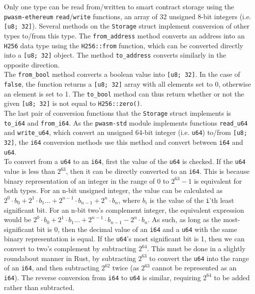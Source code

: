 Only one type can be read from/written to smart contract storage using the \texttt{pwasm-ethereum} \texttt{read}/\texttt{write} functions, an array of 32 unsigned 8-bit integers (i.e. \texttt{[u8; 32]}). Several methods on the \texttt{Storage} struct implement conversion of other types to/from this type. The \texttt{from\_address} method converts an address into an \texttt{H256} data type using the \texttt{H256::from} function, which can be converted directly into a \texttt{[u8; 32]} object. The method \texttt{to\_address} converts similarly in the opposite direction. \\

The \texttt{from\_bool} method converts a boolean value into \texttt{[u8; 32]}. In the case of \texttt{false}, the function returns a \texttt{[u8; 32]} array with all elements set to 0, otherwise an element is set to 1. The \texttt{to\_bool} method can thus return whether or not the given \texttt{[u8; 32]} is not equal to \texttt{H256::zero()}. \\

The last pair of conversion functions that the \texttt{Storage} struct implements is \texttt{to\_i64} and \texttt{from\_i64}. As the \texttt{pwasm-std} module implements functions \texttt{read\_u64} and \texttt{write\_u64}, which convert an unsigned 64-bit integer (i.e. \texttt{u64}) to/from \texttt{[u8; 32]}, the \texttt{i64} conversion methods use this method and convert between \texttt{i64} and \texttt{u64}. \\

To convert from a \texttt{u64} to an \texttt{i64}, first the value of the \texttt{u64} is checked. If the \texttt{u64} value is less than $2^{63}$, then it can be directly converted to an \texttt{i64}. This is because binary representation of an integer in the range of $0$ to $2^{63} - 1$ is equivalent for both types. For an n-bit unsigned integer, the value can be calculated as $2^0 \cdot b_0 + 2^1 \cdot b_1... + 2^{n-1} \cdot b_{n-1} + 2^n \cdot b_n$, where $b_i$ is the value of the \texttt{i}'th least significant bit. For an n-bit two's complement integer, the equivalent expression would be $2^0 \cdot b_0 + 2^1 \cdot b_1... + 2^{n-1} \cdot b_{n-1} - 2^n \cdot b_n$. As such, as long as the most-significant bit is 0, then the decimal value of an \texttt{i64} and a \texttt{u64} with the same binary representation is equal. If the \texttt{u64}'s most significant bit is 1, then we can convert to two's complement by subtracting $2^{64}$. This must be done in a slightly roundabout manner in Rust, by subtracting $2^{63}$ to convert the \texttt{u64} into the range of an \texttt{i64}, and then subtracting $2^{62}$ twice (as $2^{63}$ cannot be represented as an \texttt{i64}). The reverse conversion from \texttt{i64} to \texttt{u64} is similar, requiring $2^{64}$ to be added rather than subtracted.


